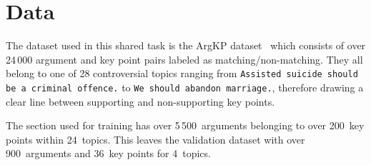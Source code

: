 \section{Data}\label{data}

The dataset used in this shared task is the ArgKP dataset~\cite{Bar-HaimEFKLS2020} which consists of over
24\,000 argument and key point pairs labeled as matching/non-matching.
They all belong to one of 28 controversial topics ranging from \texttt{Assisted suicide should be a criminal offence.} to 
\texttt{We should abandon marriage.}, therefore drawing a clear line between supporting and non-supporting key points.

The section used for training has over 5\,500~arguments belonging to over 200~key points within 24~topics. This leaves the 
validation dataset with over 900~arguments and 36~key points for 4~topics.

